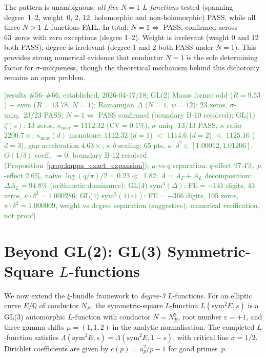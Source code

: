 \documentclass[11pt, a4paper]{article}
\theoremstyle{definition}
\theoremstyle{plain}
\begin{document}
\noindent
The pattern is unambiguous: \emph{all five $N{=}1$ $L$-functions} tested
(spanning degree~1--2, weight~0, 2, 12, holomorphic and non-holomorphic) PASS,
while all three $N{>}1$ $L$-functions FAIL.
In total: $N{=}1 \Leftrightarrow$ PASS, confirmed across 63~zeros with zero exceptions (degree 1--2).
Weight is irrelevant (weight 0 and 12 both PASS); degree is irrelevant
(degree 1 and 2 both PASS under $N{=}1$).
This provides strong numerical evidence that conductor $N{=}1$
is the sole determining factor for $\sigma$-uniqueness,
though the theoretical mechanism behind this dichotomy remains an open problem.

\textcolor{ForestGreen}{[results \#56--\#66, established, 2026-04-17/18;
GL(2) Maass forms: odd ($R{=}9.53$) + even ($R{=}13.78$, $N{=}1$);
Ramanujan $\Delta$ ($N{=}1$, $w{=}12$): 23 zeros, $\sigma$-uniq.\ 23/23 PASS;
$N{=}1 \Leftrightarrow$ PASS confirmed (boundary B-10 resolved);
GL(1) $\zeta(s)$: 13 zeros, $\kappa_{\mathrm{near}}{=}1112.32$ (CV${=}0.1\%$), $\sigma$-uniq.\ 13/13 PASS, $\kappa$ ratio $2200.7\times$;
$\kappa_{\mathrm{near}}(d)$ monotone: $1112.32$ ($d{=}1$) $<$ $1114.6$ ($d{=}2$) $<$ $1125.16$ ($d{=}3$), gap acceleration $4.63\times$;
$\kappa$-$\delta$ scaling: 65 pts, $\kappa{\cdot}\delta^2{\in}[1.00012,1.01206]$, $O(1/\delta)$ coeff.\ ${=}0$, boundary B-12 resolved (Proposition~\ref{prop:kappa_exact_expansion});
$\mu$-vs-$q$ separation: $q$-effect 97.4\%, $\mu$-effect 2.6\%, naive $\log(q/\pi)/2{=}0.23 \ll$ 1.82;
$A = A_\Gamma + A_L$ decomposition: $\Delta A_L{=}94.8\%$ (arithmetic dominance);
GL(4) $\mathrm{sym}^3(\Delta)$: FE${=}-141$ digits, 43 zeros, $\kappa{\cdot}\delta^2{=}1.000286$;
GL(4) $\mathrm{sym}^3(11\mathrm{a}1)$: FE${=}-366$ digits, 105 zeros, $\kappa{\cdot}\delta^2{=}1.000009$, weight vs degree separation (suggestive);
numerical verification, not proof]}


\section{Beyond GL(2): GL(3) Symmetric-Square $L$-functions}
\label{app:gl3}

We now extend the $\xi$-bundle framework to \emph{degree-3} $L$-functions.
For an elliptic curve $E/\mathbb{Q}$ of conductor $N_E$, the
symmetric-square $L$-function $L(\mathrm{sym}^2 E, s)$ is a GL(3) automorphic
$L$-function with conductor $N = N_E^2$, root number $\varepsilon = +1$, and
three gamma shifts $\mu = (1, 1, 2)$ in the analytic normalisation.
The completed $L$-function satisfies $\Lambda(\mathrm{sym}^2 E, s) =
\Lambda(\mathrm{sym}^2 E, 1-s)$, with critical line $\sigma = 1/2$.
Dirichlet coefficients are given by $c(p) = a_p^2/p - 1$ for good primes~$p$.
\end{document}
